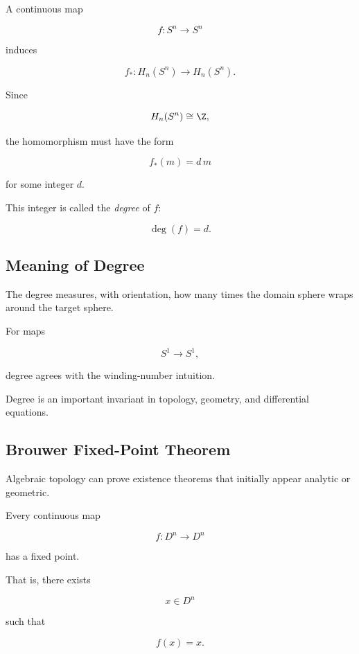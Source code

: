 A continuous map

\[
f:S^n\to S^n
\]

induces

\[
f_*:
H_n(S^n)
\to
H_n(S^n).
\]

Since

\[
H_n(S^n)\cong\Z,
\]

the homomorphism must have the form

\[
\boxed{
f_*(m)=d\,m
}
\]

for some integer \(d\).

This integer is called the \emph{degree} of \(f\):

\[
\boxed{
\deg(f)=d.
}
\]

\subsection{Meaning of Degree}
\label{subsec:meaning-degree}

The degree measures, with orientation, how many times the domain sphere
wraps around the target sphere.

For maps

\[
S^1\to S^1,
\]

degree agrees with the winding-number intuition.

Degree is an important invariant in topology, geometry, and differential
equations.

\subsection{Brouwer Fixed-Point Theorem}
\label{subsec:brouwer-fixed-point}

Algebraic topology can prove existence theorems that initially appear
analytic or geometric.

\begin{theorem}
Every continuous map

\[
f:D^n\to D^n
\]

has a fixed point.

That is, there exists

\[
x\in D^n
\]

such that

\[
\boxed{
f(x)=x.
}
\]
\end{theorem}

